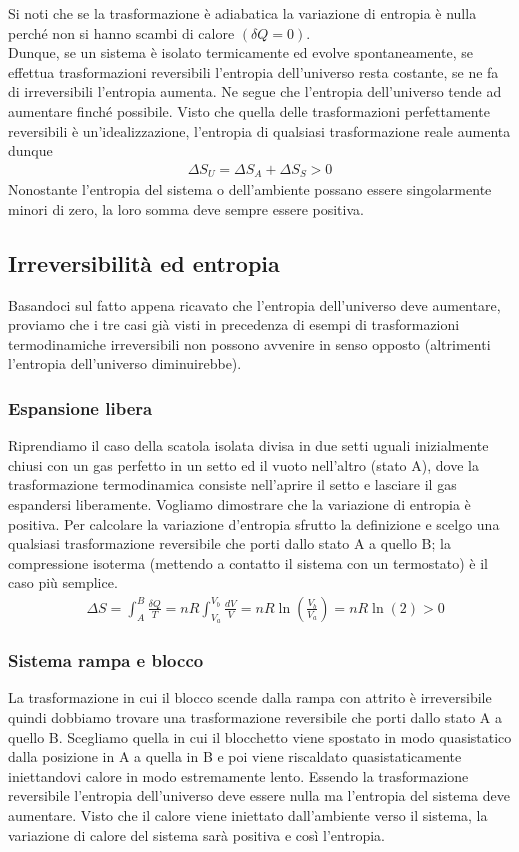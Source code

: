\documentclass[10pt,a4paper]{article}
\begin{document}
Si noti che se la trasformazione è adiabatica la variazione di entropia è nulla perché non si hanno scambi di calore \((\delta Q = 0)\). \\
Dunque, se un sistema è isolato termicamente ed evolve spontaneamente, se effettua trasformazioni reversibili l'entropia dell'universo resta costante, se ne fa di irreversibili l'entropia aumenta. Ne segue che l'entropia dell'universo tende ad aumentare finché possibile. Visto che quella delle trasformazioni perfettamente reversibili è un'idealizzazione, l'entropia di qualsiasi trasformazione reale aumenta dunque 
\begin{align*}
	\Delta S_U = \Delta S_A + \Delta S_S > 0
\end{align*}
Nonostante l'entropia del sistema o dell'ambiente possano essere singolarmente minori di zero, la loro somma deve sempre essere positiva. 
\subsection{Irreversibilità ed entropia}
Basandoci sul fatto appena ricavato che l'entropia dell'universo deve aumentare, proviamo che i tre casi già visti in precedenza di esempi di trasformazioni termodinamiche irreversibili non possono avvenire in senso opposto (altrimenti l'entropia dell'universo diminuirebbe). 
\subsubsection{Espansione libera}
Riprendiamo il caso della scatola isolata divisa in due setti uguali inizialmente chiusi con un gas perfetto in un setto ed il vuoto nell'altro (stato A), dove la trasformazione termodinamica consiste nell'aprire il setto e lasciare il gas espandersi liberamente. Vogliamo dimostrare che la variazione di entropia è positiva. Per calcolare la variazione d'entropia sfrutto la definizione e scelgo una qualsiasi trasformazione reversibile che porti dallo stato A a quello B; la compressione isoterma (mettendo a contatto il sistema con un termostato) è il caso più semplice. 
\begin{align*}
	&\Delta S = \int_{A}^{B}\frac{\delta Q}{T} = nR\int_{V_a}^{V_b}\frac{dV}{V} =nR\ln\left(\frac{V_b}{V_a}\right)= nR\ln(2)>0
\end{align*}
\subsubsection{Sistema rampa e blocco}
La trasformazione in cui il blocco scende dalla rampa con attrito è irreversibile quindi dobbiamo trovare una trasformazione reversibile che porti dallo stato A a quello B. Scegliamo quella in cui il blocchetto viene spostato in modo quasistatico dalla posizione in A a quella in B e poi viene riscaldato quasistaticamente iniettandovi calore in modo estremamente lento. Essendo la trasformazione reversibile l'entropia dell'universo deve essere nulla ma l'entropia del sistema deve aumentare. Visto che il calore viene iniettato dall'ambiente verso il sistema, la variazione di calore del sistema sarà positiva e così l'entropia. 
\end{document}
